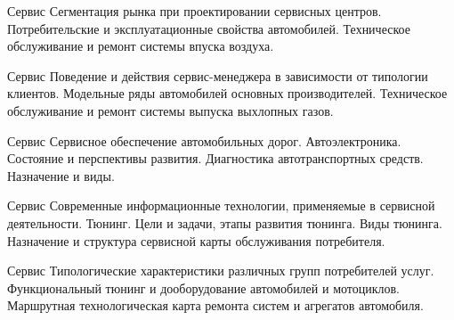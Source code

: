 \documentclass[
	11pt,
	a4paper,
	]
	{article}
\begin{document}
\vfill



\begin{minipage}[t][\miniH]{\miniL}\centering
	 {Сервис}
		{
			Сегментация рынка при проектировании сервисных центров.
		}{
			Потребительские и эксплуатационные свойства автомобилей.
		}{
			Техническое обслуживание и ремонт системы впуска воздуха.
		}
	\lowGE
\end{minipage}

\vfill



\begin{minipage}[t][\miniH]{\miniL}\centering
	 {Сервис}
		{
			Поведение и действия сервис-менеджера в зависимости от типологии клиентов.
		}{
			Модельные ряды автомобилей основных производителей.
		}{
			Техническое обслуживание и ремонт системы выпуска выхлопных газов.
		}
	\lowGE
\end{minipage}





\begin{minipage}[t][\miniH]{\miniL}\centering
	 {Сервис}
		{
			Сервисное обеспечение автомобильных дорог.
		}{
			Автоэлектроника. Состояние и перспективы развития.
		}{
			Диагностика автотранспортных средств. Назначение и виды.
		}
	\lowGE
\end{minipage}

\vfill



\begin{minipage}[t][\miniH]{\miniL}\centering
	 {Сервис}
		{
			Современные информационные технологии, применяемые в сервисной деятельности.
		}{
			Тюнинг. Цели и задачи, этапы развития тюнинга. Виды тюнинга.
		}{
			Назначение и структура сервисной карты обслуживания потребителя.
		}
	\lowGE
\end{minipage}

\vfill



\begin{minipage}[t][\miniH]{\miniL}\centering
	 {Сервис}
		{
			Типологические характеристики различных групп потребителей услуг.
		}{
			Функциональный тюнинг и дооборудование автомобилей и мотоциклов.
		}{
			Маршрутная технологическая карта ремонта систем и агрегатов автомобиля.
		}
	\lowGE
\end{minipage}
\end{document}
